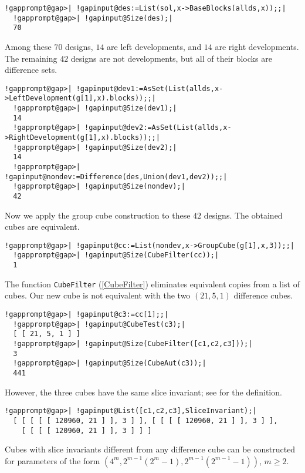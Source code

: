 \documentclass[a4paper,11pt]{report}
\begin{document}
{{\begin{Verbatim}[commandchars=!@|,fontsize=\small,frame=single,label=Example]
  !gapprompt@gap>| !gapinput@des:=List(sol,x->BaseBlocks(allds,x));;|
  !gapprompt@gap>| !gapinput@Size(des);|
  70
\end{Verbatim}
 Among these $70$ designs, $14$ are left developments, and $14$ are right developments. The remaining $42$ designs are not developments, but all of their blocks are difference sets. 
\begin{Verbatim}[commandchars=!@|,fontsize=\small,frame=single,label=Example]
  !gapprompt@gap>| !gapinput@dev1:=AsSet(List(allds,x->LeftDevelopment(g[1],x).blocks));;|
  !gapprompt@gap>| !gapinput@Size(dev1);|
  14
  !gapprompt@gap>| !gapinput@dev2:=AsSet(List(allds,x->RightDevelopment(g[1],x).blocks));;|
  !gapprompt@gap>| !gapinput@Size(dev2);|
  14
  !gapprompt@gap>| !gapinput@nondev:=Difference(des,Union(dev1,dev2));;|
  !gapprompt@gap>| !gapinput@Size(nondev);|
  42
\end{Verbatim}
 Now we apply the group cube construction to these $42$ designs. The obtained cubes are equivalent. 
\begin{Verbatim}[commandchars=!@|,fontsize=\small,frame=single,label=Example]
  !gapprompt@gap>| !gapinput@cc:=List(nondev,x->GroupCube(g[1],x,3));;|
  !gapprompt@gap>| !gapinput@Size(CubeFilter(cc));|
  1
\end{Verbatim}
 The function \texttt{CubeFilter} (\ref{CubeFilter}) eliminates equivalent copies from a list of cubes. Our new cube is not
equivalent with the two $(21,5,1)$ difference cubes. 
\begin{Verbatim}[commandchars=!@|,fontsize=\small,frame=single,label=Example]
  !gapprompt@gap>| !gapinput@c3:=cc[1];;|
  !gapprompt@gap>| !gapinput@CubeTest(c3);|
  [ [ 21, 5, 1 ] ]
  !gapprompt@gap>| !gapinput@Size(CubeFilter([c1,c2,c3]));|
  3
  !gapprompt@gap>| !gapinput@Size(CubeAut(c3));|
  441
\end{Verbatim}
 However, the three cubes have the same slice invariant; see{\nobreakspace}\cite{KPT23} for the definition. 
\begin{Verbatim}[commandchars=!@|,fontsize=\small,frame=single,label=Example]
  !gapprompt@gap>| !gapinput@List([c1,c2,c3],SliceInvariant);|
  [ [ [ [ [ 120960, 21 ] ], 3 ] ], [ [ [ [ 120960, 21 ] ], 3 ] ], 
    [ [ [ [ 120960, 21 ] ], 3 ] ] ]
\end{Verbatim}
 Cubes with slice invariants different from any difference cube can be
constructed for parameters of the form $(4^m,2^{m-1}(2^m-1),2^{m-1}(2^{m-1}-1))$, $m\ge 2$. 
\begin{Verbatim}[commandchars=!@|,fontsize=\small,frame=single,label=Example]

\end{Verbatim}}}
\end{document}
